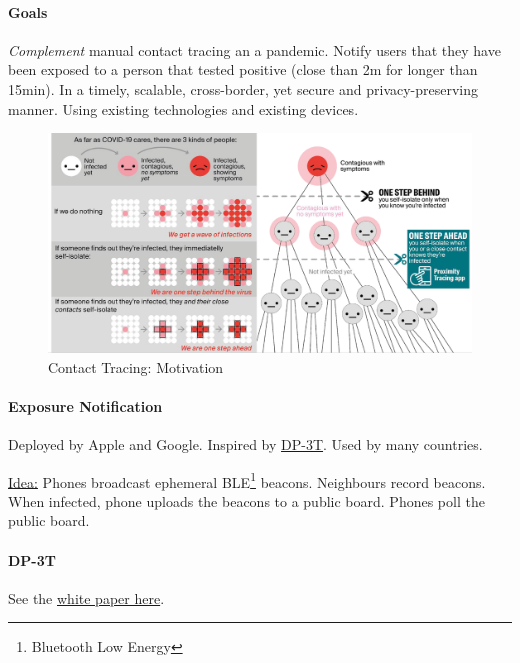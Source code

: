 \paragraph{Goals}
\textit{Complement} manual contact tracing an a pandemic.
Notify users that they have been exposed to a person that tested positive (close than 2m for longer than 15min).
In a timely, scalable, cross-border, yet secure and privacy-preserving manner.
Using existing technologies and existing devices.

\begin{figure}[h]
	\centering
	\includegraphics[scale=0.25]{images/11-why-tracing.png}
	\caption{Contact Tracing: Motivation}
	\label{fig:why-tracing}
\end{figure}

\paragraph{Exposure Notification}
Deployed by Apple and Google. Inspired by
\href{https://github.com/DP-3T/documents}{DP-3T}. Used by many countries.

\underline{Idea:}
Phones broadcast ephemeral BLE\footnote{Bluetooth Low Energy} beacons.
Neighbours record beacons.
When infected, phone uploads the beacons to a public board.
Phones poll the public board.

\paragraph{DP-3T}
See the
\href{https://github.com/DP-3T/documents/blob/master/DP3T\%20White\%20Paper.pdf}{white
	paper here}.


